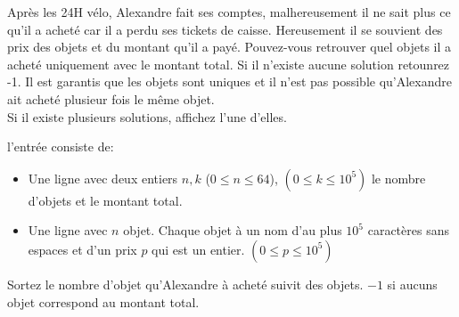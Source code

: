 \problemname{\problemyamlname}

\newcommand{\maxk}{10^5}
\newcommand{\maxn}{64}

Après les 24H vélo, Alexandre fait ses comptes, malhereusement il ne sait plus ce qu'il a acheté car il a perdu ses tickets de caisse. Hereusement il se souvient des prix des objets et du montant qu'il a payé. Pouvez-vous retrouver quel objets il a acheté uniquement avec le montant total. Si il n'existe aucune solution retounrez -1. Il est garantis que les objets sont uniques et il n'est pas possible qu'Alexandre ait acheté plusieur fois le même objet. \\
Si il existe plusieurs solutions, affichez l'une d'elles.

\begin{Input}
    l'entrée consiste de:
    \begin{itemize}
        \item Une ligne avec deux entiers $n, k$ ($0\leq n\leq \maxn$), $(0 \leq k \leq \maxk)$ le nombre d'objets et le montant total.
        \item Une ligne avec $n$ objet. Chaque objet à un nom d'au plus $10^5$ caractères sans espaces et d'un prix $p$ qui est un entier. $(0 \leq p \leq \maxk)$
    \end{itemize}
\end{Input}

\begin{Output}
    Sortez le nombre d'objet qu'Alexandre à acheté suivit des objets. $-1$ si aucuns objet correspond au montant total.
\end{Output}
